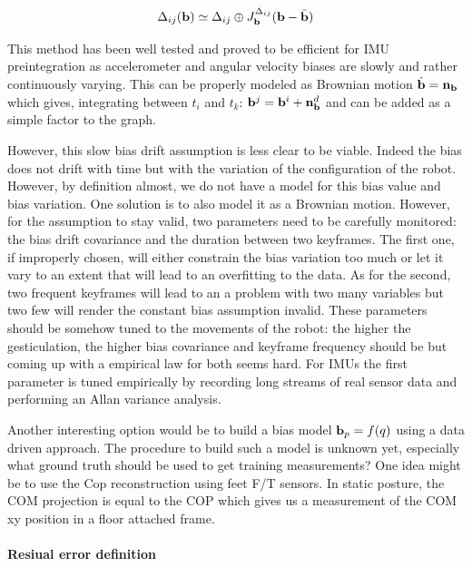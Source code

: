 \documentclass[11pt]{article}
\newcommand{\noise}{\bfn}
\newcommand{\bias}{\bfb}
\begin{document}
\begin{equation}
    \Delta_{ij}(\bias) \simeq \Delta_{ij} \oplus J^{\Delta_{ij}}_{\bias} (\bias - \bar{\bias})
\end{equation}

This method has been well tested and proved to be efficient for IMU preintegration as accelerometer and angular velocity biases are slowly and rather continuously varying. This can be properly modeled as Brownian motion $\dot{\bias} = \noise_{\bias}$ which gives, integrating between $t_i$ and $t_k$: $\bias^j = \bias^i + \noise_{\bias}^d$ and can be added as a simple factor to the graph.

However, this slow bias drift assumption is less clear to be viable. Indeed the bias does not drift with time but with the variation of the configuration of the robot. However, by definition almost, we do not have a model for this bias value and bias variation. One solution is to also model it as a Brownian motion. However, for the assumption to stay valid, two parameters need to be carefully monitored: the bias drift covariance and the duration between two keyframes. The first one, if improperly chosen, will either constrain the bias variation too much or let it vary to an extent that will lead to an overfitting to the data. As for the second, two frequent keyframes will lead to an a problem with two many variables but two few will render the constant bias assumption invalid. These parameters should be somehow tuned to the movements of the robot: the higher the gesticulation, the higher bias covariance and keyframe frequency should be but coming up with a empirical law for both seems hard. For IMUs the first parameter is tuned empirically by recording long streams of real sensor data and performing an Allan variance analysis.

Another interesting option would be to build a bias model $\bias_p = f(q)$ using a data driven approach. The procedure to build such a model is unknown yet, especially what ground truth should be used to get training measurements? One idea might be to use the Cop reconstruction using feet F/T sensors. In static posture, the COM projection is equal to the COP which gives us a measurement of the COM xy position in a floor attached frame.





\paragraph{Resiual error definition}
\end{document}
